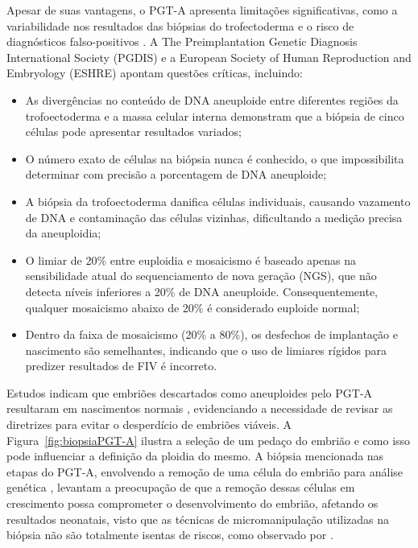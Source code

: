 Apesar de suas vantagens, o PGT-A apresenta limitações significativas, como a variabilidade nos resultados das biópsias do trofectoderma e o risco de diagnósticos falso-positivos \cite{gleicher2021}. A The Preimplantation Genetic Diagnosis International Society (PGDIS) e a European Society of Human Reproduction and Embryology (ESHRE) apontam questões críticas, incluindo:

\begin{itemize}
    \item As divergências no conteúdo de DNA aneuploide entre diferentes regiões da trofoectoderma e a massa celular interna demonstram que a biópsia de cinco células pode apresentar resultados variados;
    \item O número exato de células na biópsia nunca é conhecido, o que impossibilita determinar com precisão a porcentagem de DNA aneuploide;
    \item A biópsia da trofoectoderma danifica células individuais, causando vazamento de DNA e contaminação das células vizinhas, dificultando a medição precisa da aneuploidia;
    \item O limiar de 20\% entre euploidia e mosaicismo é baseado apenas na sensibilidade atual do sequenciamento de nova geração (NGS), que não detecta níveis inferiores a 20\% de DNA aneuploide. Consequentemente, qualquer mosaicismo abaixo de 20\% é considerado euploide normal;
    \item Dentro da faixa de mosaicismo (20\% a 80\%), os desfechos de implantação e nascimento são semelhantes, indicando que o uso de limiares rígidos para predizer resultados de FIV é incorreto.
\end{itemize}

Estudos indicam que embriões descartados como aneuploides pelo PGT-A resultaram em nascimentos normais \cite{gleicher2021}, evidenciando a necessidade de revisar as diretrizes para evitar o desperdício de embriões viáveis. A Figura~\ref{fig:biopsiaPGT-A} ilustra a seleção de um pedaço do embrião e como isso pode influenciar a definição da ploidia do mesmo. A biópsia mencionada nas etapas do PGT-A, envolvendo a remoção de uma célula do embrião para análise genética , levantam a preocupação de que a remoção dessas células em crescimento possa comprometer o desenvolvimento do embrião, afetando os resultados neonatais, visto que as técnicas de micromanipulação utilizadas na biópsia não são totalmente isentas de riscos, como observado por .

